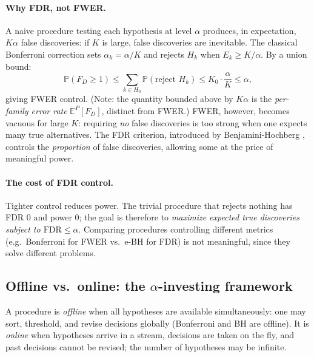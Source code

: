 \documentclass[11pt,a4paper]{article}
\theoremstyle{plain}
\theoremstyle{definition}
\theoremstyle{remark}
\newcommand{\E}{\mathbb{E}}
\newcommand{\Prob}{\mathbb{P}}
\newcommand{\FDR}{\mathrm{FDR}}
\begin{document}
\paragraph{Why FDR, not FWER.}
A naive procedure testing each hypothesis at level $\alpha$ produces, in
expectation, $K\alpha$ false discoveries: if $K$ is large, false discoveries
are inevitable. The classical Bonferroni correction sets $\alpha_k = \alpha/K$
and rejects $H_k$ when $E_k \geq K/\alpha$. By a union bound:
\[
  \Prob(F_D \geq 1)
    \leq \sum_{k \in H_0} \Prob(\text{reject } H_k)
    \leq K_0 \cdot \frac{\alpha}{K}
    \leq \alpha,
\]
giving FWER control. (Note: the quantity bounded above by $K\alpha$ is the
\emph{per-family error rate} $\E^P[F_D]$, distinct from FWER.) FWER, however,
becomes vacuous for large $K$: requiring \emph{no} false discoveries is too
strong when one expects many true alternatives. The FDR criterion, introduced
by Benjamini-Hochberg \cite{BH1995}, controls the \emph{proportion} of false
discoveries, allowing some at the price of meaningful power.

\paragraph{The cost of FDR control.}
Tighter control reduces power. The trivial procedure that rejects nothing has
FDR $0$ and power $0$; the goal is therefore to \emph{maximize expected true
discoveries subject to $\FDR \leq \alpha$}. Comparing procedures controlling
different metrics (e.g.\ Bonferroni for FWER vs.\ e-BH for FDR) is not
meaningful, since they solve different problems.

\subsection{Offline vs.\ online: the $\alpha$-investing framework}
\label{sec:investing}

A procedure is \emph{offline} when all hypotheses are available
simultaneously: one may sort, threshold, and revise decisions globally
(Bonferroni and BH are offline). It is \emph{online} when hypotheses arrive
in a stream, decisions are taken on the fly, and past decisions cannot be
revised; the number of hypotheses may be infinite.
\end{document}
